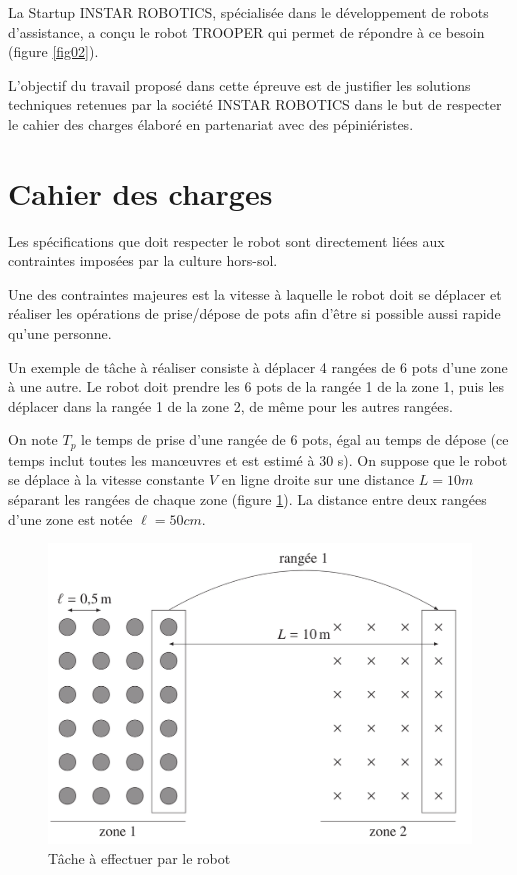 La Startup INSTAR ROBOTICS, spécialisée dans le développement de robots d'assistance, a conçu le robot TROOPER qui permet de répondre à ce besoin (figure \ref{fig02}).

L'objectif du travail proposé dans cette épreuve est de justifier les solutions techniques retenues par la société INSTAR ROBOTICS dans le but de respecter le cahier des charges élaboré en partenariat avec des pépiniéristes.

\section{Cahier des charges}

Les spécifications que doit respecter le robot sont directement liées aux contraintes imposées par la culture hors-sol.

Une des contraintes majeures est la vitesse à laquelle le robot doit se déplacer et réaliser les opérations de prise/dépose de pots afin d'être si possible aussi rapide qu'une personne.

Un exemple de tâche à réaliser consiste à déplacer 4 rangées de 6 pots d'une zone à une autre. Le robot doit prendre les 6 pots de la rangée 1 de la zone 1, puis les déplacer dans la rangée 1 de la zone 2, de même pour les autres rangées.

On note $T_p$ le temps de prise d'une rangée de 6 pots, égal au temps de dépose (ce temps inclut toutes les man\oe uvres et est estimé à 30 s). On suppose que le robot se déplace à la vitesse constante $V$ en ligne droite sur une distance $L=10m$ séparant les rangées de chaque zone (figure \ref{fig03}). La distance entre deux rangées d'une zone est notée $\ell=50cm$.

\begin{figure}[ht!]
\begin{center}
 \includegraphics[width=0.8\linewidth]{img/fig03}
\end{center}
\caption{Tâche à effectuer par le robot}
\label{fig03}
\end{figure}

